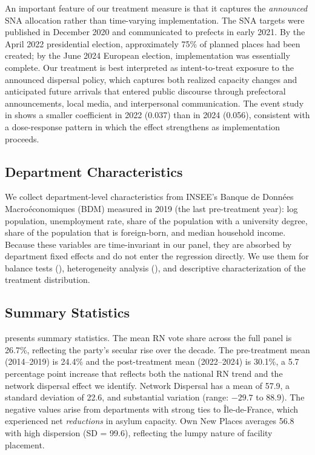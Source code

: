 \documentclass[12pt]{article}
\begin{document}
An important feature of our treatment measure is that it captures the \textit{announced} SNA allocation rather than time-varying implementation. The SNA targets were published in December 2020 and communicated to prefects in early 2021. By the April 2022 presidential election, approximately 75\% of planned places had been created; by the June 2024 European election, implementation was essentially complete. Our treatment is best interpreted as intent-to-treat exposure to the announced dispersal policy, which captures both realized capacity changes and anticipated future arrivals that entered public discourse through prefectoral announcements, local media, and interpersonal communication. The event study in  shows a smaller coefficient in 2022 (0.037) than in 2024 (0.056), consistent with a dose-response pattern in which the effect strengthens as implementation proceeds.

\subsection{Department Characteristics}

We collect department-level characteristics from INSEE's Banque de Donn\'ees Macro\-\'economiques (BDM) measured in 2019 (the last pre-treatment year): log population, unemployment rate, share of the population with a university degree, share of the population that is foreign-born, and median household income. Because these variables are time-invariant in our panel, they are absorbed by department fixed effects and do not enter the regression directly. We use them for balance tests (), heterogeneity analysis (), and descriptive characterization of the treatment distribution.

\subsection{Summary Statistics}



 presents summary statistics. The mean RN vote share across the full panel is 26.7\%, reflecting the party's secular rise over the decade. The pre-treatment mean (2014--2019) is 24.4\% and the post-treatment mean (2022--2024) is 30.1\%, a 5.7 percentage point increase that reflects both the national RN trend and the network dispersal effect we identify. Network Dispersal has a mean of 57.9, a standard deviation of 22.6, and substantial variation (range: $-29.7$ to $88.9$). The negative values arise from departments with strong ties to \^Ile-de-France, which experienced net \textit{reductions} in asylum capacity. Own New Places averages 56.8 with high dispersion (SD = 99.6), reflecting the lumpy nature of facility placement.
\end{document}
